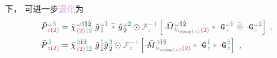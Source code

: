 下， 可进一步\textcolor{Plum}{退化}为
\begin{subequations} \label{eq:DP^(2)-3_12-chieff-G}
\begin{align}
	\Xint{\mathcolor{gray}{-}}{30}{\bar{P}}^{\;\! \mathcolor{gray}{\omega} \textcolor{PineGreen}{\hat{3}} }_{\;\! \mathcolor{gray}{z} \textcolor{Maroon}{(2)} } &= \bar{\chi}^{\;\! \mathcolor{gray}{\omega} \textcolor{PineGreen}{\hat{3}} \hat{1} \hat{2} }_{\;\! \textcolor{Maroon}{(2)} \textcolor{PineGreen}{\hat{1} \hat{2}}} ~ {\hat{g}}^{\;\! \mathcolor{gray}{\omega} \textcolor{PineGreen}{\hat{1}}}_{\;\! \hat{1}} ~\mathcolor{gray}{\widetilde *}~ {\hat{g}}^{\;\! \mathcolor{gray}{\omega} \textcolor{PineGreen}{\hat{2}}}_{\;\! \hat{2}} \odot \mathcolor{gray}{\mathcal F_{z}^{-1}} \left[ \Xint{\mathcolor{gray}{-}}{18}{\bar{M}}^{\;\! \mathcolor{gray}{\omega} \hat{1} \hat{2} }_{\;\! \mathcolor{gray}{k_{\symup{z}}} \textcolor{Maroon}{(2)} } \mathcolor{gray}{*} \Xint{\mathcolor{gray}{-}}{20}{\mathtt{G}}^{\;\! \mathcolor{gray}{\omega} \textcolor{PineGreen}{\hat{1}}}_{\;\! \mathcolor{gray}{z}} ~\mathcolor{gray}{\widetilde \circledast}~ \Xint{\mathcolor{gray}{-}}{20}{\mathtt{G}}^{\;\! \mathcolor{gray}{\omega} \textcolor{PineGreen}{\hat{2}}}_{\;\! \mathcolor{gray}{z}} \right] ~, \label{eq:DP^(2)-3_12-spectrum-chieff-G} \\
	\Xint{\mathcolor{gray}{-}}{30}{\bar{P}}^{\;\! \textcolor{PineGreen}{\hat{3}} }_{\;\! \mathcolor{gray}{z} \textcolor{Maroon}{(2)} } &= \bar{\chi}^{\;\! \textcolor{PineGreen}{\hat{3}} \hat{1} \hat{2} }_{\;\! \textcolor{Maroon}{(2)} \textcolor{PineGreen}{\hat{1} \hat{2}}} ~ {\hat{g}}^{\;\! \textcolor{PineGreen}{\hat{1}}}_{\;\! \hat{1}}  {\hat{g}}^{\;\! \textcolor{PineGreen}{\hat{2}}}_{\;\! \hat{2}} \odot \mathcolor{gray}{\mathcal F_{z}^{-1}} \left[ \Xint{\mathcolor{gray}{-}}{18}{\bar{M}}^{\;\! \mathcolor{gray}{3} \hat{1} \hat{2} }_{\;\! \mathcolor{gray}{k_{\symup{z}}} \textcolor{Maroon}{(2)} } \mathcolor{gray}{*} \Xint{\mathcolor{gray}{-}}{20}{\mathtt{G}}^{\;\! \textcolor{PineGreen}{\hat{1}}}_{\;\! \mathcolor{gray}{z}} \mathcolor{gray}{*} \Xint{\mathcolor{gray}{-}}{20}{\mathtt{G}}^{\;\! \textcolor{PineGreen}{\hat{2}}}_{\;\! \mathcolor{gray}{z}} \right] ~, \label{eq:DP^(2)-3_12-discrete-chieff-G}
\end{align}
\end{subequations}
